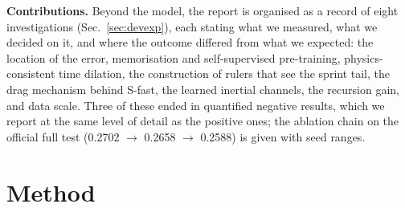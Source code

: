 \documentclass[letterpaper,10pt,conference]{ieeeconf}
\begin{document}
\textbf{Contributions.} Beyond the model, the report is organised as a record of eight
investigations (Sec.~\ref{sec:devexp}), each stating what we measured, what we decided on it, and
where the outcome differed from what we expected: the location of the error, memorisation and
self-supervised pre-training, physics-consistent time dilation, the construction of rulers that
see the sprint tail, the drag mechanism behind S-fast, the learned inertial channels, the
recursion gain, and data scale. Three of these ended in quantified negative results, which we
report at the same level of detail as the positive ones; the ablation chain on the official full
test (0.2702 $\to$ 0.2658 $\to$ 0.2588) is given with seed ranges.

\section{Method}
\end{document}
